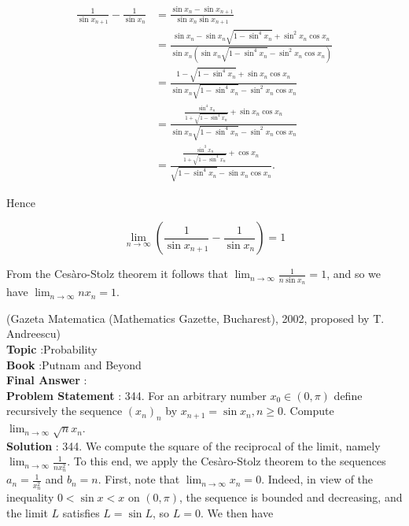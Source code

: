 \documentclass[10pt]{article}
\begin{document}
$$
\begin{aligned}
\frac{1}{\sin x_{n+1}}-\frac{1}{\sin x_{n}} &=\frac{\sin x_{n}-\sin x_{n+1}}{\sin x_{n} \sin x_{n+1}} \\
&=\frac{\sin x_{n}-\sin x_{n} \sqrt{1-\sin ^{4} x_{n}}+\sin ^{2} x_{n} \cos x_{n}}{\sin x_{n}\left(\sin x_{n} \sqrt{1-\sin ^{4} x_{n}}-\sin ^{2} x_{n} \cos x_{n}\right)} \\
&=\frac{1-\sqrt{1-\sin ^{4} x_{n}}+\sin x_{n} \cos x_{n}}{\sin x_{n} \sqrt{1-\sin ^{4} x_{n}}-\sin ^{2} x_{n} \cos x_{n}} \\
&=\frac{\frac{\sin ^{4} x_{n}}{1+\sqrt{1-\sin ^{4} x_{n}}}+\sin x_{n} \cos x_{n}}{\sin x_{n} \sqrt{1-\sin ^{4} x_{n}}-\sin ^{2} x_{n} \cos x_{n}} \\
&=\frac{\frac{\sin ^{3} x_{n}}{1+\sqrt{1-\sin ^{4} x_{n}}}+\cos x_{n}}{\sqrt{1-\sin ^{4} x_{n}}-\sin x_{n} \cos x_{n}} .
\end{aligned}
$$

Hence

$$
\lim _{n \rightarrow \infty}\left(\frac{1}{\sin x_{n+1}}-\frac{1}{\sin x_{n}}\right)=1
$$

From the Cesàro-Stolz theorem it follows that $\lim _{n \rightarrow \infty} \frac{1}{n \sin x_{n}}=1$, and so we have $\lim _{n \rightarrow \infty} n x_{n}=1$.

(Gazeta Matematica (Mathematics Gazette, Bucharest), 2002, proposed by T. Andreescu)
\\
\textbf{Topic} :Probability\\
\textbf{Book} :Putnam and Beyond\\
\textbf{Final Answer} :\\


\textbf{Problem Statement} :
344. For an arbitrary number $x_{0} \in(0, \pi)$ define recursively the sequence $\left(x_{n}\right)_{n}$ by $x_{n+1}=\sin x_{n}, n \geq 0$. Compute $\lim _{n \rightarrow \infty} \sqrt{n} x_{n}$.
\\
\textbf{Solution} :
344. We compute the square of the reciprocal of the limit, namely $\lim _{n \rightarrow \infty} \frac{1}{n x_{n}^{2}}$. To this end, we apply the Cesàro-Stolz theorem to the sequences $a_{n}=\frac{1}{x_{n}^{2}}$ and $b_{n}=n$. First, note that $\lim _{n \rightarrow \infty} x_{n}=0$. Indeed, in view of the inequality $0<\sin x<x$ on $(0, \pi)$, the sequence is bounded and decreasing, and the limit $L$ satisfies $L=\sin L$, so $L=0$. We then have
\end{document}
